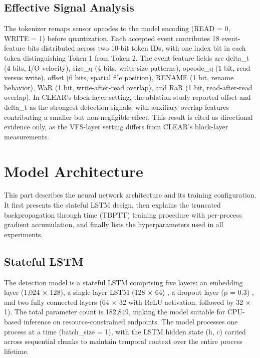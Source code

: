 \subsection{Effective Signal Analysis}\label{sec:3.4.2}

The tokenizer remaps sensor opcodes to the model encoding (READ = 0, WRITE = 1) before quantization. Each accepted event contributes 18 event-feature bits distributed across two 10-bit token IDs, with one index bit in each token distinguishing Token 1 from Token 2. The event-feature fields are delta\_\allowbreak{}t (4 bits, I/\allowbreak{}O velocity), size\_\allowbreak{}q (4 bits, write-size patterns), opcode\_\allowbreak{}q (1 bit, read versus write), offset (6 bits, spatial file position), RENAME (1 bit, rename behavior), WaR (1 bit, write-after-read overlap), and RaR (1 bit, read-after-read overlap). In CLEAR's block-layer setting, the ablation study reported offset and delta\_\allowbreak{}t as the strongest detection signals, with auxiliary overlap features contributing a smaller but non-negligible effect. This result is cited as directional evidence only, as the VFS-layer setting differs from CLEAR's block-layer measurements.

\section{Model Architecture}\label{sec:3.5}

This part describes the neural network architecture and its training configuration. It first presents the stateful \textmu{}LSTM design, then explains the truncated backpropagation through time (TBPTT) training procedure with per-process gradient accumulation, and finally lists the hyperparameters used in all experiments.

\subsection{Stateful \textmu{}LSTM}\label{sec:3.5.1}

The detection model is a stateful \textmu{}LSTM comprising five layers: an embedding layer (1,024 $\times$ 128), a single-layer LSTM (128 $\times$ 64) \cite{ref43}, a dropout layer (p = 0.3) \cite{ref44}, and two fully connected layers (64 $\times$ 32 with ReLU activation, followed by 32 $\times$ 1). The total parameter count is 182,849, making the model suitable for CPU-based inference on resource-constrained endpoints. The model processes one process at a time (batch\_\allowbreak{}size = 1), with the LSTM hidden state (h, c) carried across sequential chunks to maintain temporal context over the entire process lifetime.

